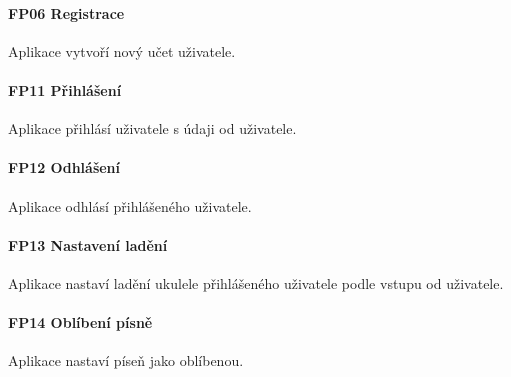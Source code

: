 \noindent \begin{minipage}{\textwidth}
    \paragraph{FP06 Registrace} \label{FP06}
    \begin{smallindent}{}
        Aplikace vytvoří nový učet uživatele.
    \end{smallindent}
\end{minipage}

\noindent \begin{minipage}{\textwidth}
    \paragraph{FP11 Přihlášení} \label{FP11}
    \begin{smallindent}{}
        Aplikace přihlásí uživatele s údaji od uživatele.
    \end{smallindent}
\end{minipage}

\noindent \begin{minipage}{\textwidth}
    \paragraph{FP12 Odhlášení} \label{FP12}
    \begin{smallindent}{}
        Aplikace odhlásí přihlášeného uživatele.
    \end{smallindent}
\end{minipage}

\noindent \begin{minipage}{\textwidth}
    \paragraph{FP13 Nastavení ladění} \label{FP13}
    \begin{smallindent}{}
        Aplikace nastaví ladění ukulele přihlášeného uživatele podle vstupu od uživatele.
    \end{smallindent}
\end{minipage}

\noindent \begin{minipage}{\textwidth}
    \paragraph{FP14 Oblíbení písně} \label{FP14}
    \begin{smallindent}{}
        Aplikace nastaví píseň jako oblíbenou.
    \end{smallindent}
\end{minipage}

